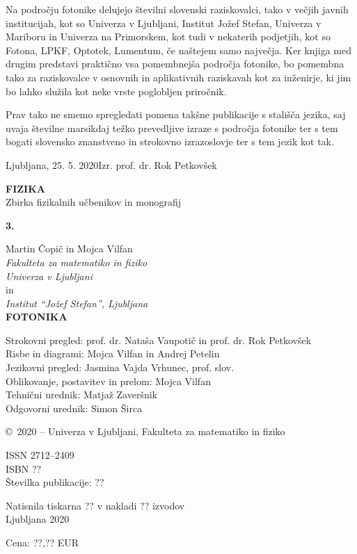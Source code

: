 \documentclass[a4paper,10pt,fleqn]{book}
\begin{document}
Na področju fotonike delujejo številni slovenski raziskovalci, tako v večjih javnih institucijah, kot so Univerza v Ljubljani, Institut Jožef Stefan, Univerza v Mariboru in Univerza na Primorskem, kot tudi v nekaterih podjetjih, kot so Fotona, LPKF, Optotek, Lumentum, če naštejem samo največja. Ker knjiga med drugim predstavi praktično vsa pomembnejša področja fotonike, bo pomembna tako za raziskovalce v osnovnih in aplikativnih raziskavah kot za inženirje, ki jim bo lahko služila kot neke vrste poglobljen priročnik.

Prav tako ne smemo spregledati pomena takšne publikacije s stališča jezika, saj uvaja številne marsikdaj težko prevedljive izraze s področja fotonike ter s tem bogati slovensko znanstveno in strokovno izrazoslovje ter s tem jezik kot tak.

Ljubljana, 25. 5. 2020\hfill Izr. prof. dr. Rok Petkovšek 


\lihastran
{}
\sloppy
\raggedright
\footnotesize
\printindex
\normalsize


\sodastran
\thispagestyle{empty}
\parindent=0pt

\textbf{FIZIKA} \\
Zbirka fizikalnih učbenikov in monografij

\bigskip
\bigskip
\textbf{\large 3.}

\bigskip
Martin Čopič in Mojca Vilfan\\
{\it Fakulteta za matematiko in fiziko\\
Univerza v Ljubljani}\\
in\\
{\it Institut ``Jožef Stefan'', Ljubljana}\\

\bigskip
\textbf{FOTONIKA}

\bigskip
\bigskip
Strokovni pregled: prof. dr. Nataša Vaupotič in prof. dr. Rok Petkovšek \\
Risbe in diagrami: Mojca Vilfan in Andrej Petelin \\
Jezikovni pregled: Jasmina Vajda Vrhunec, prof. slov. \\
Oblikovanje, postavitev in prelom: Mojca Vilfan \\
Tehnični urednik: Matjaž Zaveršnik \\
Odgovorni urednik: Simon Širca

\bigskip
\copyright\ 2020 -- Univerza v Ljubljani, Fakulteta za matematiko in fiziko

\bigskip
ISSN 2712--2409 \\
ISBN ?? \\
Številka publikacije: ??

\bigskip
Natisnila tiskarna ?? v nakladi ?? izvodov \\
Ljubljana 2020

\bigskip
Cena: ??,?? {\small EUR}

\end{document}
